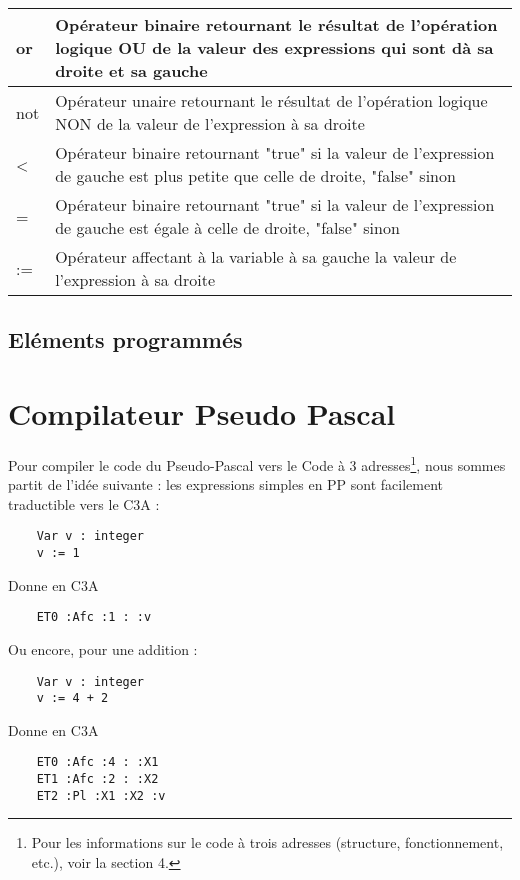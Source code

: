 \documentclass{article}
\begin{document}
\begin{tabular}{|p{2cm}|p{11cm}|}
  or & Opérateur binaire retournant le résultat de l'opération logique OU de la valeur des expressions qui sont dà sa droite et sa gauche\\ \hline
  not & Opérateur unaire retournant le résultat de l'opération logique NON de la valeur de l'expression à sa droite \\ \hline
  < & Opérateur binaire retournant "true" si la valeur de l'expression de gauche est plus petite que celle de droite, "false" sinon\\ \hline
  = & Opérateur binaire retournant "true" si la valeur de l'expression de gauche est égale à celle de droite, "false" sinon\\ \hline
  := & Opérateur affectant à la variable à sa gauche la valeur de l'expression à sa droite \\ \hline
\end{tabular}



\subsection{Eléments programmés}



\newpage
\section{Compilateur Pseudo Pascal}

Pour compiler le code du Pseudo-Pascal vers le Code à 3 adresses\footnote{Pour les informations sur le code à trois adresses (structure, fonctionnement, etc.), voir la section 4.}, nous sommes partit de l'idée suivante : les expressions simples en PP sont facilement traductible vers le C3A :

\begin{lstlisting}
    Var v : integer
    v := 1
\end{lstlisting}

Donne en C3A

\begin{lstlisting}
    ET0 :Afc :1 : :v
\end{lstlisting}

Ou encore, pour une addition :

\begin{lstlisting}
    Var v : integer
    v := 4 + 2
\end{lstlisting}

Donne en C3A

\begin{lstlisting}
    ET0 :Afc :4 : :X1
    ET1 :Afc :2 : :X2
    ET2 :Pl :X1 :X2 :v
\end{lstlisting}
\end{document}
